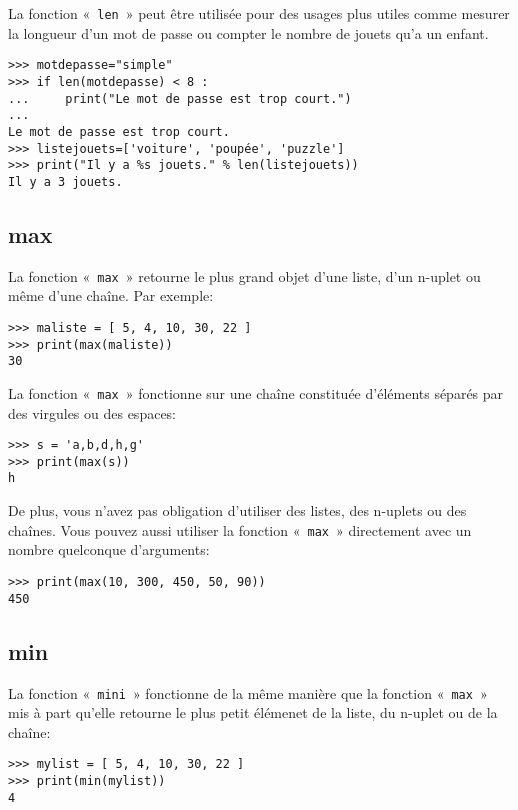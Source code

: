 La fonction «~\texttt{len}~» peut être utilisée pour des usages plus utiles comme mesurer la longueur d'un mot de passe ou compter le nombre de jouets qu'a un enfant.

\begin{Verbatim}[frame=single,rulecolor=\color{gray}]
>>> motdepasse="simple"
>>> if len(motdepasse) < 8 :
...     print("Le mot de passe est trop court.")
...
Le mot de passe est trop court.
>>> listejouets=['voiture', 'poupée', 'puzzle']
>>> print("Il y a %s jouets." % len(listejouets))
Il y a 3 jouets.
\end{Verbatim} 

\subsection*{max}

La fonction «~\texttt{max}~» retourne le plus grand objet d'une liste,  d'un n-uplet ou même d'une chaîne. Par exemple:

\begin{Verbatim}[frame=single,rulecolor=\color{gray}]
>>> maliste = [ 5, 4, 10, 30, 22 ]
>>> print(max(maliste))
30
\end{Verbatim}

La fonction «~\texttt{max}~» fonctionne sur une chaîne constituée d'éléments séparés par des virgules ou des espaces:
\begin{Verbatim}[frame=single,rulecolor=\color{gray}]
>>> s = 'a,b,d,h,g'
>>> print(max(s))
h
\end{Verbatim}

De plus, vous n'avez pas obligation d'utiliser des listes, des n-uplets ou des chaînes. Vous pouvez aussi utiliser la fonction «~\texttt{max}~» directement avec un nombre quelconque d'arguments:
\begin{Verbatim}[frame=single,rulecolor=\color{gray}]
>>> print(max(10, 300, 450, 50, 90))
450
\end{Verbatim}

\subsection*{min}
La fonction «~\texttt{mini}~» fonctionne de la même manière que la fonction «~\texttt{max}~» mis à part qu'elle retourne le plus petit élémenet de la liste, du n-uplet ou de la chaîne:
\begin{Verbatim}[frame=single,rulecolor=\color{gray}]
>>> mylist = [ 5, 4, 10, 30, 22 ]
>>> print(min(mylist))
4
\end{Verbatim}

